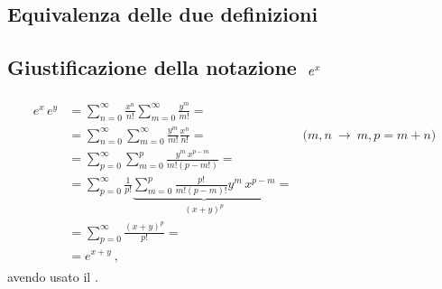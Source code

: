 \documentclass[letterpaper,10pt,english]{jupyterBook}
\begin{document}
\subsection{Equivalenza delle due definizioni}
\label{\detokenize{ch/exponential_logarithm-proof:equivalenza-delle-due-definizioni}}

\subsection{Giustificazione della notazione \protect\(\ e^x\protect\)}
\label{\detokenize{ch/exponential_logarithm-proof:giustificazione-della-notazione-e-x}}\begin{equation*}
\begin{split}\begin{aligned}
  e^x \, e^y 
  & = \sum_{n=0}^{\infty} \frac{x^n}{n!} \sum_{m = 0}^{\infty} \frac{y^m}{m!} = \\
  & = \sum_{n=0}^{\infty} \sum_{m=0}^{\infty} \frac{y^m}{m!} \frac{x^n}{n!} =  & \text{($m,n \  \rightarrow \ m,p=m+n$)}\\
  & = \sum_{p=0}^{\infty} \sum_{m=0}^{p} \frac{y^m \, x^{p-m}}{m! (p-m!)} = \\
  & = \sum_{p=0}^{\infty} \frac{1}{p!} \underbrace{\sum_{m=0}^{p} \frac{p!}{m! (p-m)!} y^m \, x^{p-m}}_{(x+y)^p} = \\
  & = \sum_{p=0}^{\infty} \frac{(x+y)^p}{p!} = \\
  & = e^{x+y} \ ,
\end{aligned}\end{split}
\end{equation*}
\sphinxAtStartPar
avendo usato il {\hyperref[\detokenize{ch/precalculus/polynomials:math-hs-precalculus-polynomials-binomial-thm}]{}}.

\sphinxstepscope
\end{document}
